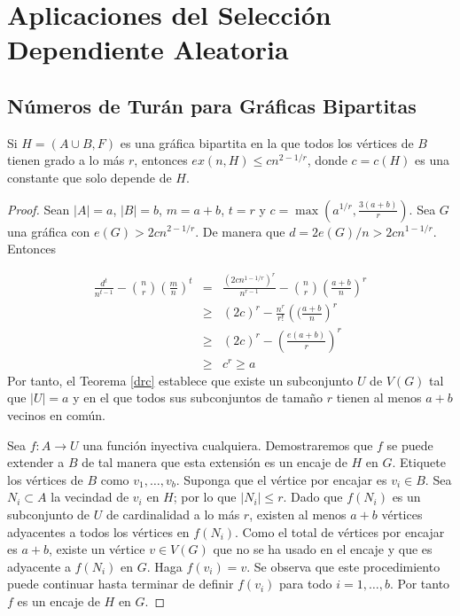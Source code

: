 \chapter{Aplicaciones del Selección Dependiente Aleatoria}

\section{Números de Turán para Gráficas Bipartitas}

\begin{theorem}
  Si $H = (A \cup B, F)$ es una gráfica bipartita en la que todos los
  vértices de $B$ tienen grado
  a lo más $r$, entonces $ex(n, H) \leq c n^{2 - 1 / r}$, donde $c =
  c(H)$ es una constante que solo depende de $H$.
\end{theorem}
\begin{proof}
  Sean $\vert A \vert = a$, $\vert B
  \vert = b$, $m = a + b$, $t = r$
  y $c = \max(a^{1/r}, \frac{3(a + b)}{r})$. Sea $G$ una gráfica con
  $e(G) > 2 c n^{2 -1 /
  r}$. De manera que $d = 2e(G) / n > 2 c n^{1 - 1/r}$. Entonces

  \begin{eqnarray*}
    \frac{d^{t}}{n^{t-1}} - \binom{n}{r} \left(\frac{m}{n}\right)^t
    &=& \frac{(2c
    n^{1-1/r})^r}{n^{r-1}}  - \binom{n}{r} \left(\frac{a + b}{n}\right)^r\\
    &\geq& (2c)^r - \frac{n^r}{r!} \left((\frac{a + b}{n}\right)^r \\
      &\geq& (2c)^r - \left(\frac{e (a + b)}{r}\right)^r\\
      &\geq& c^r \geq a
    \end{eqnarray*}
    Por tanto, el Teorema \ref{drc} establece que existe un subconjunto
    $U$ de $V(G)$ tal que $\vert U \vert = a$ y en el que todos sus
    subconjuntos de tamaño
    $r$ tienen al menos $a + b$ vecinos en común.

    Sea $f: A \rightarrow U$ una función inyectiva cualquiera.
    Demostraremos que $f$ se puede extender a $B$ de tal manera que
    esta extensión es un encaje de $H$ en $G$. Etiquete los vértices de $B$ como
    $v_1, \ldots, v_b$. Suponga que el vértice por encajar es $v_i \in
    B$. Sea $N_i \subset A$ la vecindad de $v_i$ en $H$; por lo que
    $\vert N_i \vert \leq r$. Dado que $f(N_i)$ es un subconjunto de
    $U$ de cardinalidad a lo más $r$, existen al menos $a + b$ vértices
    adyacentes a todos los vértices en $f(N_i)$. Como el total de
    vértices por encajar es $a + b$, existe un vértice $v \in V(G)$ que
    no se ha usado en el encaje y que es adyacente a $f(N_i)$ en $G$.
    Haga $f(v_i)  = v$. Se observa que este procedimiento puede
    continuar hasta terminar de definir $f(v_i)$ para todo $i = 1,
    \ldots, b$. Por tanto $f$ es un encaje de  $H$ en $G$.
  \end{proof}

